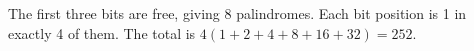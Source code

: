 The first three bits are free, giving 8 palindromes. Each bit position is 1 in exactly 4 of them. The total is $4(1+2+4+8+16+32)=\boxed{252}$.
